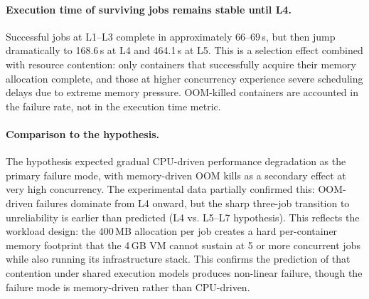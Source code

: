 \paragraph{Execution time of surviving jobs remains stable until L4.}
Successful jobs at L1--L3 complete in approximately 66--69\,s, but then jump dramatically to 168.6\,s at L4 and 464.1\,s at L5.
This is a selection effect combined with resource contention: only containers that successfully acquire their memory allocation complete, and those at higher concurrency experience severe scheduling delays due to extreme memory pressure.
OOM-killed containers are accounted in the failure rate, not in the execution time metric.

\paragraph{Comparison to the hypothesis.}
The hypothesis expected gradual CPU-driven performance degradation as the primary failure mode, with memory-driven OOM kills as a secondary effect at very high concurrency.
The experimental data partially confirmed this: OOM-driven failures dominate from L4 onward, but the sharp three-job transition to unreliability is earlier than predicted (L4 vs. L5--L7 hypothesis).
This reflects the workload design: the 400\,MB allocation per job creates a hard per-container memory footprint that the 4\,GB VM cannot sustain at 5 or more concurrent jobs while also running its infrastructure stack.
This confirms the prediction of \citet{arora2023} that contention under shared execution models produces non-linear failure, though the failure mode is memory-driven rather than CPU-driven.
